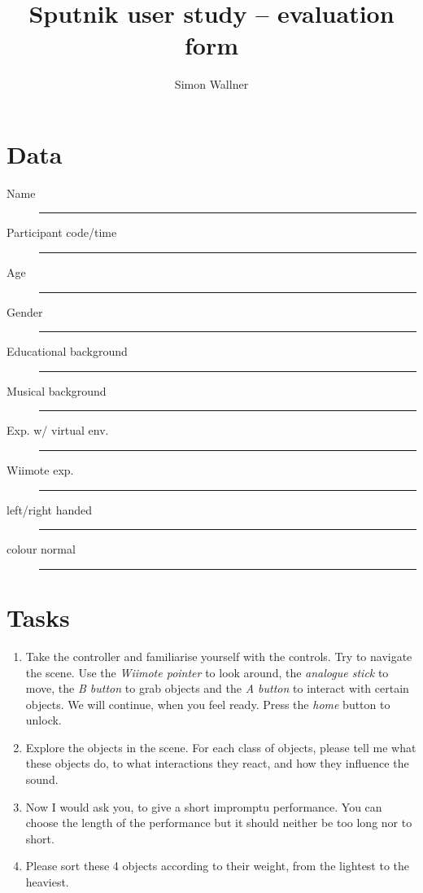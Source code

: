 \documentclass[10pt,a4paper]{scrartcl}
\author{Simon Wallner}
\title{Sputnik user study -- evaluation form}
\begin{document}
\maketitle

\section{Data}
\begin{description}
\item[Name] \rule{\linewidth}{0.25pt}
\item[Participant code/time] \rule{\linewidth}{0.25pt}
\item[Age] \rule{\linewidth}{0.25pt}
\item[Gender] \rule{\linewidth}{0.25pt}
\item[Educational background] \rule{\linewidth}{0.25pt}
\item[Musical background] \rule{\linewidth}{0.25pt}
\item[Exp. w/ virtual env.] \rule{\linewidth}{0.25pt}
\item[Wiimote exp.] \rule{\linewidth}{0.25pt}
\item[left/right handed] \rule{\linewidth}{0.25pt}
\item[colour normal] \rule{\linewidth}{0.25pt}
\end{description}

\section{Tasks}
\begin{enumerate}

\item Take the controller and familiarise yourself with the controls. Try to navigate the scene. Use the \emph{Wiimote pointer} to look around, the \emph{analogue stick} to move, the \emph{B button} to grab objects and the \emph{A button} to interact with certain objects. We will continue, when you feel ready. Press the \emph{home} button to unlock.

\item Explore the objects in the scene. For each class of objects, please tell me what these objects do, to what interactions they react, and how they influence the sound.

\item Now I would ask you, to give a short impromptu performance. You can choose the length of the performance but it should neither be too long nor to short.

\item Please sort these 4 objects according to their weight, from the lightest to the heaviest.
\end{enumerate}
\end{document}
